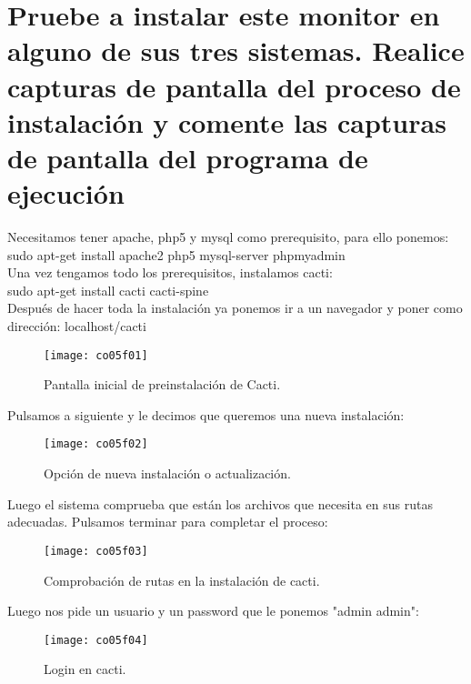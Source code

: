 \section{Pruebe a instalar este monitor en alguno de sus tres sistemas. Realice capturas de pantalla del proceso de instalación y comente las capturas de pantalla 	del programa de ejecución}

Necesitamos tener apache, php5 y mysql como prerequisito, para ello ponemos:\\

sudo apt-get install apache2 php5 mysql-server phpmyadmin\\

Una vez tengamos todo los prerequisitos, instalamos cacti:\\

sudo apt-get install cacti cacti-spine\\

Después de hacer toda la instalación ya ponemos ir a un navegador y poner como dirección: localhost/cacti

\begin{figure}[H]
	\centering
	\texttt{[image: co05f01]}
	\caption{Pantalla inicial de preinstalación de Cacti.}
	\label{fig:co05f01}
\end{figure}

Pulsamos a siguiente y le decimos que queremos una nueva instalación:

\begin{figure}[H]
	\centering
	\texttt{[image: co05f02]}
	\caption{Opción de nueva instalación o actualización.}
	\label{fig:co05f02}
\end{figure}

Luego el sistema comprueba que están los archivos que necesita en sus rutas adecuadas. Pulsamos terminar para completar el proceso:

\begin{figure}[H]
	\centering
	\texttt{[image: co05f03]}
	\caption{Comprobación de rutas en la instalación de cacti.}
	\label{fig:co05f03}
\end{figure}

Luego nos pide un usuario y un password que le ponemos "admin admin":

\begin{figure}[H]
	\centering
	\texttt{[image: co05f04]}
	\caption{Login en cacti.}
	\label{fig:co05f04}
\end{figure}

